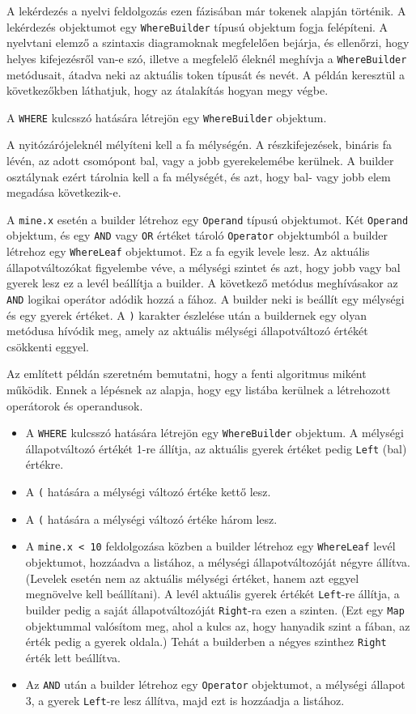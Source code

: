 A lekérdezés a nyelvi feldolgozás ezen fázisában már tokenek alapján történik. A lekérdezés objektumot egy \texttt{WhereBuilder} típusú objektum fogja felépíteni. A nyelvtani elemző a szintaxis diagramoknak megfelelően bejárja, és ellenőrzi, hogy helyes kifejezésről van-e szó, illetve a megfelelő éleknél meghívja a \texttt{WhereBuilder} metódusait, átadva neki az aktuális token típusát és nevét. A példán keresztül a következőkben láthatjuk, hogy az átalakítás hogyan megy végbe.

A \texttt{WHERE} kulcsszó hatására létrejön egy \texttt{WhereBuilder} objektum.

A nyitózárójeleknél mélyíteni kell a fa mélységén. A részkifejezések, bináris fa lévén, az adott csomópont bal, vagy a jobb gyerekelemébe kerülnek. A builder osztálynak ezért tárolnia kell a fa mélységét, és azt, hogy bal- vagy jobb elem megadása következik-e.

A \texttt{mine.x} esetén a builder létrehoz egy \texttt{Operand} típusú objektumot. Két \texttt{Operand} objektum, és egy \texttt{AND} vagy \texttt{OR} értéket tároló \texttt{Operator}  objektumból a builder létrehoz egy \texttt{WhereLeaf} objektumot. Ez a fa egyik levele lesz. Az aktuális állapotváltozókat figyelembe véve, a mélységi szintet és azt, hogy jobb vagy bal gyerek lesz ez a levél beállítja a builder. A következő metódus meghívásakor az \texttt{AND} logikai operátor adódik hozzá a fához. A builder neki is beállít egy mélységi és egy gyerek értéket. A \texttt{)} karakter észlelése után a buildernek egy olyan metódusa hívódik meg, amely az aktuális mélységi állapotváltozó értékét csökkenti eggyel.

Az említett példán szeretném bemutatni, hogy a fenti algoritmus miként működik. Ennek a lépésnek az alapja, hogy egy listába kerülnek a létrehozott operátorok és operandusok.

\begin{itemize}
\item A \texttt{WHERE} kulcsszó hatására létrejön egy \texttt{WhereBuilder} objektum. A mélységi állapotváltozó értékét 1-re állítja, az aktuális gyerek értéket pedig \texttt{Left} (bal) értékre.
\item A \texttt{(} hatására a mélységi változó értéke kettő lesz.
\item A \texttt{(} hatására a mélységi változó értéke három lesz.
\item A \texttt{mine.x < 10} feldolgozása közben a builder létrehoz egy \texttt{WhereLeaf} levél objektumot, hozzáadva a listához, a mélységi állapotváltozóját négyre állítva. (Levelek esetén nem az aktuális mélységi értéket, hanem azt eggyel megnövelve kell beállítani). A levél aktuális gyerek értékét \texttt{Left}-re állítja, a builder pedig a saját állapotváltozóját \texttt{Right}-ra ezen a szinten. (Ezt egy \texttt{Map} objektummal valósítom meg, ahol a kulcs az, hogy hanyadik szint a fában, az érték pedig a gyerek oldala.) Tehát a builderben a négyes szinthez \texttt{Right} érték lett beállítva.
\item Az \texttt{AND} után a builder létrehoz egy \texttt{Operator} objektumot, a mélységi állapot 3, a gyerek \texttt{Left}-re lesz állítva, majd ezt is hozzáadja a listához.
\end{itemize}

